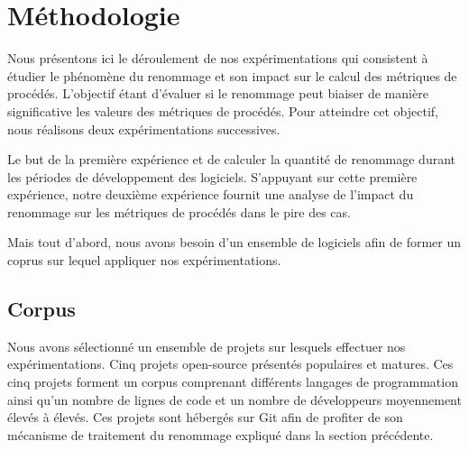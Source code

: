 \section{Méthodologie}
\label{sec:methodologie}

Nous présentons ici le déroulement de nos expérimentations qui consistent à étudier le phénomène du renommage et son impact sur le calcul des métriques de procédés. L’objectif étant d’évaluer si le renommage peut biaiser de manière significative les valeurs des métriques de procédés. Pour atteindre cet objectif, nous réalisons deux expérimentations successives.

Le but de la première expérience et de calculer la quantité de renommage durant les périodes de développement des logiciels. S’appuyant sur cette première expérience, notre deuxième expérience fournit une analyse de l’impact du renommage sur les métriques de procédés dans le pire des cas. 

Mais tout d'abord, nous avons besoin d'un ensemble de logiciels afin de former un coprus sur lequel appliquer nos expérimentations. 

\subsection{Corpus}

Nous avons sélectionné un ensemble de projets sur lesquels effectuer nos expérimentations. Cinq projets open-source présentés  populaires et matures. Ces cinq projets forment un corpus comprenant différents langages de programmation ainsi qu'un nombre de lignes de code et un nombre de développeurs moyennement élevés à élevés.
Ces projets sont hébergés sur Git afin de profiter de son mécanisme de traitement du renommage expliqué dans la section précédente. \\


